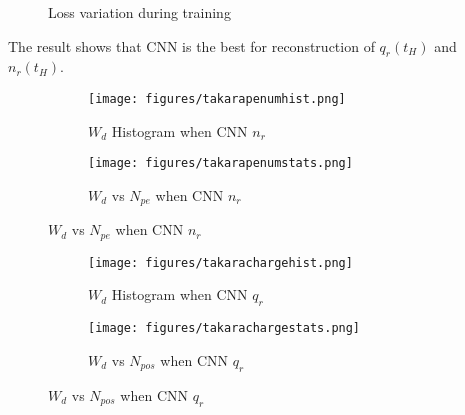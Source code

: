 \begin{figure}[H]
    \centering
    \scalebox{0.4}{}
    \caption{\label{fig:loss} Loss variation during training}
\end{figure}

The result shows that CNN is the best for reconstruction of $q_{r}(t_{H})$ and $n_{r}(t_{H})$. 

\begin{figure}[H]
\begin{minipage}{.5\textwidth}
\begin{figure}[H]
    \centering
        \texttt{[image: figures/takarapenumhist.png]}
    \caption{$W_{d}$ Histogram when CNN $n_{r}$}
\end{figure}
\end{minipage}
\begin{minipage}{.5\textwidth}
\begin{figure}[H]
    \centering
        \texttt{[image: figures/takarapenumstats.png]}
    \caption{$W_{d}$ vs $N_{pe}$ when CNN $n_{r}$}
\end{figure}
\end{minipage}
\end{figure}
\begin{figure}[H]
\begin{minipage}{.5\textwidth}
\begin{figure}[H]
    \centering
        \texttt{[image: figures/takarachargehist.png]}
    \caption{$W_{d}$ Histogram when CNN $q_{r}$}
\end{figure}
\end{minipage}
\begin{minipage}{.5\textwidth}
\begin{figure}[H]
    \centering
        \texttt{[image: figures/takarachargestats.png]}
    \caption{$W_{d}$ vs $N_{pos}$ when CNN $q_{r}$}
\end{figure}
\end{minipage}
\end{figure}

